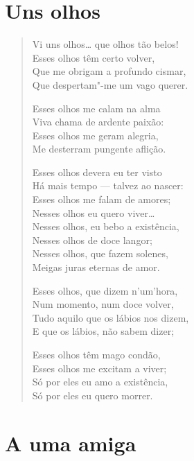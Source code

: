 \chapter{Uns olhos}

\begin{verse}
Vi uns olhos\ldots{} que olhos tão belos!\\
Esses olhos têm certo volver,\\
Que me obrigam a profundo cismar,\\
Que despertam"-me um vago querer.

Esses olhos me calam na alma\\
Viva chama de ardente paixão:\\
Esses olhos me geram alegria,\\
Me desterram pungente aflição.

Esses olhos devera eu ter visto\\
Há mais tempo --- talvez ao nascer:\\
Esses olhos me falam de amores;\\
Nesses olhos eu quero viver\ldots{}\\
Nesses olhos, eu bebo a existência,\\
Nesses olhos de doce langor;\\
Nesses olhos, que fazem solenes,\\
Meigas juras eternas de amor.

Esses olhos, que dizem n'um'hora,\\
Num momento, num doce volver,\\
Tudo aquilo que os lábios nos dizem,\\
E que os lábios, não sabem dizer;

Esses olhos têm mago condão,\\
Esses olhos me excitam a viver;\\
Só por eles eu amo a existência,\\
Só por eles eu quero morrer.
\end{verse}

\chapter{A uma amiga}

